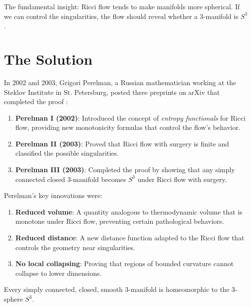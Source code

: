 \begin{highlightbox}
The fundamental insight: Ricci flow tends to make manifolds more spherical. If we can control the singularities, the flow should reveal whether a 3-manifold is $S^3$.
\end{highlightbox}

\section{The Solution}

In 2002 and 2003, Grigori Perelman, a Russian mathematician working at the Steklov Institute in St. Petersburg, posted three preprints on arXiv that completed the proof \cite{perelman2002,perelman2003a,perelman2003b}:

\begin{enumerate}
\item \textbf{Perelman I (2002)}: Introduced the concept of \emph{entropy functionals} for Ricci flow, providing new monotonicity formulas that control the flow's behavior.
\item \textbf{Perelman II (2003)}: Proved that Ricci flow with surgery is finite and classified the possible singularities.
\item \textbf{Perelman III (2003)}: Completed the proof by showing that any simply connected closed 3-manifold becomes $S^3$ under Ricci flow with surgery.
\end{enumerate}

Perelman's key innovations were:

\begin{enumerate}
\item \textbf{Reduced volume}: A quantity analogous to thermodynamic volume that is monotone under Ricci flow, preventing certain pathological behaviors.
\item \textbf{Reduced distance}: A new distance function adapted to the Ricci flow that controls the geometry near singularities.
\item \textbf{No local collapsing}: Proving that regions of bounded curvature cannot collapse to lower dimensions.
\end{enumerate}

\begin{theorem}
Every simply connected, closed, smooth 3-manifold is homeomorphic to the 3-sphere $S^3$.
\end{theorem}

